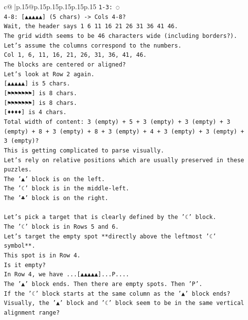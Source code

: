 \documentclass{article}
\begin{document}
{\begin{supertabular}{c@{$\;$}|p{.15\linewidth}@{}p{.15\linewidth}p{.15\linewidth}p{.15\linewidth}p{.15\linewidth}p{.15\linewidth}}
{{{\texttt{1{-}3: ◌} \\
\texttt{4{-}8: {[}▲▲▲▲▲{]} (5 chars) {-}> Cols 4{-}8?} \\
\texttt{Wait, the header says 1 6 11 16 21 26 31 36 41 46.} \\
\texttt{The grid width seems to be 46 characters wide (including borders?).} \\
\texttt{Let's assume the columns correspond to the numbers.} \\
\texttt{Col 1, 6, 11, 16, 21, 26, 31, 36, 41, 46.} \\
\texttt{The blocks are centered or aligned?} \\
\texttt{Let's look at Row 2 again.} \\
\texttt{{[}▲▲▲▲▲{]} is 5 chars.} \\
\texttt{{[}⚑⚑⚑⚑⚑⚑⚑{]} is 8 chars.} \\
\texttt{{[}⚑⚑⚑⚑⚑⚑⚑{]} is 8 chars.} \\
\texttt{{[}♦♦♦♦{]} is 4 chars.} \\
\texttt{Total width of content: 3 (empty) + 5 + 3 (empty) + 3 (empty) + 3 (empty) + 8 + 3 (empty) + 8 + 3 (empty) + 4 + 3 (empty) + 3 (empty) + 3 (empty)?} \\
\texttt{This is getting complicated to parse visually.} \\
\texttt{Let's rely on relative positions which are usually preserved in these puzzles.} \\
\texttt{The '▲' block is on the left.} \\
\texttt{The '☾' block is in the middle{-}left.} \\
\texttt{The '♣' block is on the right.} \\
\\ 
\texttt{Let's pick a target that is clearly defined by the '☾' block.} \\
\texttt{The '☾' block is in Rows 5 and 6.} \\
\texttt{Let's target the empty spot **directly above the leftmost '☾' symbol**.} \\
\texttt{This spot is in Row 4.} \\
\texttt{Is it empty?} \\
\texttt{In Row 4, we have ...{[}▲▲▲▲▲{]}...P....} \\
\texttt{The '▲' block ends. Then there are empty spots. Then 'P'.} \\
\texttt{If the '☾' block starts at the same column as the '▲' block ends?} \\
\texttt{Visually, the '▲' block and '☾' block seem to be in the same vertical alignment range?} \\
}}}
\end{supertabular}}
\end{document}
